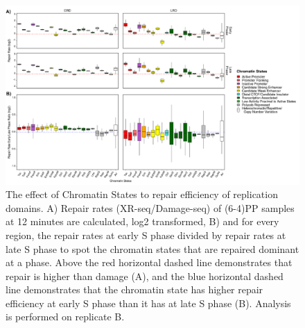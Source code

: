 \begin{figure}[H]
\begin{center}
\includegraphics[width=\textwidth]{Chapters/7_appendix/figures/supfig14}
\caption[The effect of Chromatin States to repair efficiency of replication domains for (6-4)PP samples at 12 minutes (replicate A).]{The effect of Chromatin States to repair efficiency of replication domains. A) Repair rates (XR-seq/Damage-seq) of (6-4)PP samples at 12 minutes are calculated, log2 transformed, B) and for every region, the repair rates at early S phase divided by repair rates at late S phase to spot the chromatin states that are repaired dominant at a phase. Above the red horizontal dashed line demonstrates that repair is higher than damage (A), and the blue horizontal dashed line demonstrates that the chromatin state has higher repair efficiency at early S phase than it has at late S phase (B). Analysis is performed on replicate B.}
\label{supfig:chromatin2}
\end{center}
\end{figure}

